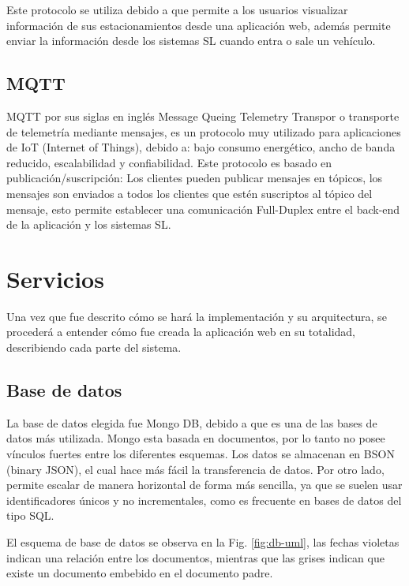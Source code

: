 Este protocolo se utiliza debido a que permite  a los usuarios visualizar información de sus estacionamientos desde una aplicación web, además permite enviar la información desde los sistemas SL cuando entra o sale un vehículo.

\subsection{MQTT}

MQTT por sus siglas en inglés Message Queing Telemetry Transpor o transporte de telemetría mediante mensajes,
es un protocolo muy utilizado para aplicaciones de IoT (Internet of Things), debido a: bajo consumo energético, ancho de banda reducido, escalabilidad y confiabilidad.
Este protocolo es basado en publicación/suscripción: Los clientes pueden publicar mensajes en tópicos, los mensajes son enviados a todos los clientes que estén suscriptos al tópico del mensaje, esto permite establecer una comunicación Full-Duplex entre el back-end de la aplicación y los sistemas SL.

\section{Servicios}

Una vez que fue descrito cómo se hará la implementación y su arquitectura, se procederá a entender cómo fue creada la aplicación web en su totalidad, describiendo cada parte del sistema.

\subsection{Base de datos}

La base de datos elegida fue Mongo DB, debido a que es una de las bases de datos más utilizada. Mongo esta basada en documentos, por lo tanto no posee vínculos fuertes entre los diferentes esquemas.
Los datos se almacenan en BSON (binary JSON), el cual hace más fácil la transferencia de datos. Por otro lado, permite escalar de manera horizontal de forma más sencilla, ya que se suelen usar identificadores únicos y no incrementales, como es frecuente en bases de datos del tipo SQL.

El esquema de base de datos se observa en la Fig. \ref{fig:db-uml}, las fechas violetas indican una relación entre los documentos, mientras que las grises indican que existe un documento embebido en el documento padre.

